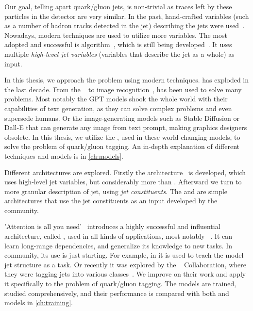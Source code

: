 Our goal, telling apart quark/gluon jets, is non-trivial as traces left by these particles in the detector are very similar.
In the past, hand-crafted variables (such as a number of hadron tracks detected in the jet) describing the jets were used~\cite{ntrk_tag}.
Nowadays, modern \ml techniques are used to utilize more variables.
The most adopted and successful is \bdt algorithm~\cite{bdt}, which is still being developed~\cite{bdt_tag}.
It uses multiple \emph{high-level jet variables} (variables that describe the jet as a whole) as input.

In this thesis, we approach the problem using modern \dl techniques.
\dl has exploded in the last decade.
From the \nlp~\cite{bert} to image recognition~\cite{deit3}, \dl has been used to solve many problems.
Most notably the GPT \cite{gpt3,gpt4} models shook the whole world with their capabilities of text generation, as they can solve complex problems and even supersede humans. 
Or the image-generating models such as Stable Diffusion \cite{stable_diff} or Dall-E \cite{dalle} that can generate any image from text prompt, making graphics designers obsolete.
In this thesis, we utilize the \dl, used in these world-changing models, to solve the problem of quark/gluon tagging.
An in-depth explanation of different \dl techniques and models is in \cref{ch:models}.

Different architectures are explored.
Firstly the \highway architecture~\cite{highway} is developed, which uses high-level jet variables, but considerably more than \bdt. 
Afterward we turn to more granular description of jet, using \emph{jet constituents}. 
The \EFN and \PFN \cite{efn} are simple architectures that use the jet constituents as an input developed by the \HEP community.

'Attention is all you need'~\cite{att_is_all} introduces a highly successful and influential architecture, called \trans, used in all kinds of applications, most notably \nlp~\cite{bert,gpt3,gpt4,deit3,cait}.
It can learn long-range dependencies, and generalize its knowledge to new tasks.
In \HEP community, its use is just starting.
For example, in \cite{qcd_as_nlp} it is used to teach the model jet structure as a \nlp task.  
Or recently it was explored by the \CMS~\cite{cms} Collaboration, where they were tagging jets into various classes~\cite{part}.
We improve on their work and apply it specifically to the problem of quark/gluon tagging.
The models are trained, studied comprehensively, and their performance is compared with both \ml and \dl models in \cref{ch:training}.





